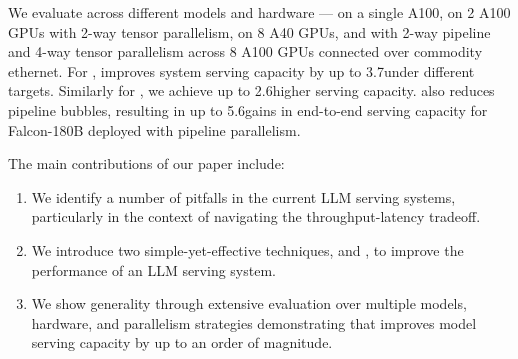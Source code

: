We evaluate \sysname across different models and hardware --- \mistral on a single A100, \yi on 2 A100 GPUs with 2-way tensor parallelism, \llamaL on 8 A40 GPUs, and \falcon with 2-way pipeline and 4-way tensor parallelism across 8 A100 GPUs connected over commodity ethernet. For \yi, \sysname improves system serving capacity by up to 3.7\myx under different \slo targets. Similarly for \mistral, we achieve up to 2.6\myx higher serving capacity. 
\sysname also reduces pipeline bubbles, resulting in up to 5.6\myx gains in end-to-end serving capacity for Falcon-180B deployed with pipeline parallelism.

The main contributions of our paper include:
\begin{enumerate}[noitemsep,topsep=0pt,parsep=0pt,partopsep=0pt]
    \item We identify a number of pitfalls in the current LLM serving systems, particularly in the context of navigating the throughput-latency tradeoff.
    \item We introduce two simple-yet-effective techniques, \chunking and \hbatch, to improve the performance of an LLM serving system. 
    \item We show generality through extensive evaluation over multiple models, hardware, and parallelism strategies demonstrating that \sysname improves model serving capacity by up to an order of magnitude.
\end{enumerate}
